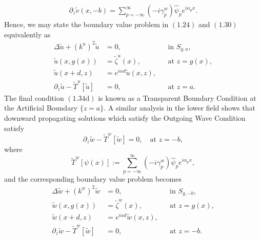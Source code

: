 \begin{align}
\partial_z \tilde{v}(x,-b)=\sum_{p=-\infty}^{\infty}\left(-i\gamma_p^w\right)\hat{\psi}_pe^{i\alpha_px}.
\end{align}
Hence, we may state the boundary value problem in $(1.24)$ and $(1.30)$ equivalently as
\begin{subequations}
\begin{align}
\Delta \tilde{u} + (k^u)^2 \tilde{u} &=0,&& \text{in $S_{g,a}$},\\
\tilde{u}(x,g(x))&=\tilde{\zeta}^u(x),&& \text{at $z=g(x)$},\\
\tilde{u}(x+d,z)&=e^{i\alpha d}\tilde{u}(x,z),\\
\partial_z \tilde{u} - \tilde{T}^u[\tilde{u}]&=0,&&  \text{at $z=a$.}
\end{align}
\end{subequations}
The final condition $(1.34\text{d})$ is known as a Transparent Boundary Condition at the Artificial Boundary $\{z=a\}$. A similar analysis in the lower field shows that downward propagating solutions which satisfy the Outgoing Wave Condition satisfy
$$\partial_z \tilde{w} - \tilde{T}^w[\tilde{w}]=0,\quad \text{at $z=-b$},$$
where $$\tilde{T}^w[\psi(x)] := \sum_{p=-\infty}^{\infty}\left(-i\gamma_p^w\right)\hat{\psi}_pe^{i\alpha_px},$$
and the corresponding boundary value problem becomes 
\begin{subequations}
\begin{align}
\Delta \tilde{w} + (k^w)^2 \tilde{w} &=0,&& \text{in $S_{g,-b}$},\\
\tilde{w}(x,g(x))&=\tilde{\zeta}^w(x),&& \text{at $z=g(x)$},\\
\tilde{w}(x+d,z)&=e^{i\alpha d}\tilde{w}(x,z),\\
\partial_z \tilde{w} - \tilde{T}^w[\tilde{w}]&=0,&&  \text{at $z=-b$.}
\end{align}
\end{subequations}